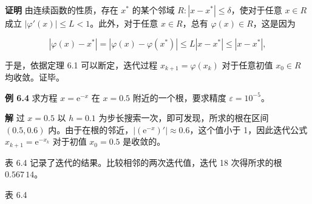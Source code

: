 \textbf{证明} 由连续函数的性质，存在 \(x^*\) 的某个邻域 \(R:|x-x^*|\leqslant\delta\)，使对于任意 \(x\in R\) 成立 \(|\varphi'(x)|\leqslant L<1\)。此外，对于任意 \(x\in R\)，总有 \(\varphi(x)\in R\)，这是因为

\[
|\varphi(x)-x^*|=|\varphi(x)-\varphi(x^*)|\leqslant L|x-x^*|\leqslant|x-x^*|,
\]

于是，依据定理 6.1 可以断定，迭代过程 \(x_{k+1}=\varphi(x_k)\) 对于任意初值 \(x_0\in R\) 均收敛。证毕。

\textbf{例 6.4} 求方程 \(x=\mathrm{e}^{-x}\) 在 \(x=0.5\) 附近的一个根，要求精度 \(\varepsilon=10^{-5}\)。

\textbf{解} 过 \(x=0.5\) 以 \(h=0.1\) 为步长搜索一次，即可发现，所求的根在区间 \((0.5,0.6)\) 内。由于在根的邻近，\(|(\mathrm{e}^{-x})'|\approx0.6\)，这个值小于 1，因此迭代公式 \(x_{k+1}=\mathrm{e}^{-x_k}\) 对于初值 \(x_0=0.5\) 是收敛的。

表 6.4 记录了迭代的结果。比较相邻的两次迭代值，迭代 18 次得所求的根 \(0.567\,14\)。

表 6.4

